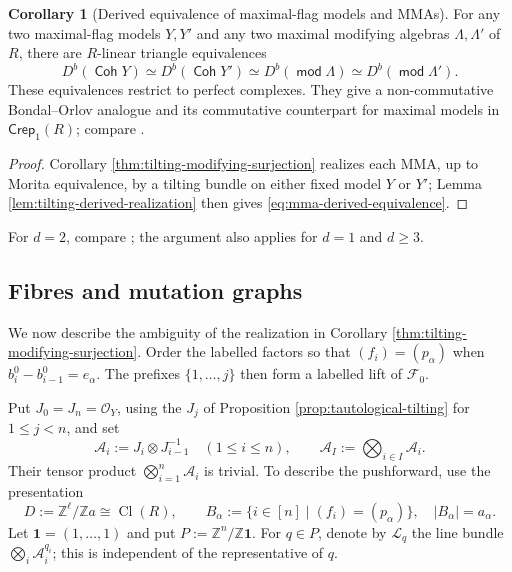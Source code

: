 \documentclass[a4paper,reqno]{amsart}
\def\F{\mathcal{F}}
\def\O{\mathcal{O}}
\DeclareMathOperator{\md}{\mathsf{mod}}
\renewcommand{\mod}{\md}
\DeclareMathOperator{\Coh}{\mathsf{Coh}}
\DeclareMathOperator{\Cl}{Cl}
\theoremstyle{definition}
\newtheorem{Cor}[Thm]{Corollary}
\begin{document}
\begin{Cor}[Derived equivalence of maximal-flag models and MMAs]\label{cor:mma-derived-equivalence}
For any two maximal-flag models $Y,Y'$ and any two maximal modifying algebras $\Lambda,\Lambda'$ of $R$, there are $R$-linear triangle equivalences
\begin{equation}\label{eq:mma-derived-equivalence}
D^b(\Coh Y)\simeq D^b(\Coh Y')\simeq D^b(\mod\Lambda)\simeq D^b(\mod\Lambda').
\end{equation}
These equivalences restrict to perfect complexes. They give a non-commutative Bondal--Orlov analogue and its commutative counterpart for maximal models in $\mathsf{Crep}_1(R)$; compare \cite[Conjectures 1.1 and 1.4]{IW13}.
\end{Cor}
\begin{proof}
Corollary \ref{thm:tilting-modifying-surjection} realizes each MMA, up to Morita equivalence, by a tilting bundle on either fixed model $Y$ or $Y'$; Lemma \ref{lem:tilting-derived-realization} then gives \eqref{eq:mma-derived-equivalence}.
\end{proof}

For $d=2$, compare \cite[Theorem 4.16]{IW}; the argument also applies for $d=1$ and $d\ge3$.

\subsection{Fibres and mutation graphs}\label{sec:pushforward-fibres}\label{sec:mutation-quotients}\label{sec:fixed-model-classification}\label{sec:cone-graph-quotients}

We now describe the ambiguity of the realization in Corollary \ref{thm:tilting-modifying-surjection}. Order the labelled factors so that $(f_i)=(p_\alpha)$ when $b_i^0-b_{i-1}^0=e_\alpha$. The prefixes $\{1,\ldots,j\}$ then form a labelled lift of $\F_0$.

Put $J_0=J_n=\O_Y$, using the $J_j$ of Proposition \ref{prop:tautological-tilting} for $1\le j<n$, and set
\[
\mathcal A_i:=J_i\otimes J_{i-1}^{-1}\quad(1\le i\le n),\qquad
\mathcal A_I:=\bigotimes_{i\in I}\mathcal A_i.
\]
Their tensor product $\bigotimes_{i=1}^n\mathcal A_i$ is trivial. To describe the pushforward, use the presentation
\[
D:=\mathbb Z^\ell/\mathbb Za\cong\Cl(R),\qquad
B_\alpha:=\{i\in[n]\mid(f_i)=(p_\alpha)\},\quad |B_\alpha|=a_\alpha.
\]
Let $\mathbf1=(1,\ldots,1)$ and put $P:=\mathbb Z^n/\mathbb Z\mathbf1$. For $q\in P$, denote by $\mathcal L_q$ the line bundle $\bigotimes_i\mathcal A_i^{q_i}$; this is independent of the representative of $q$.
\end{document}
